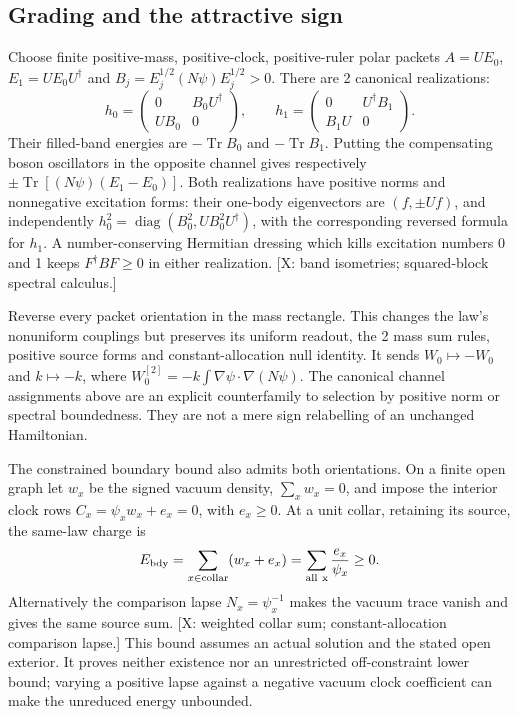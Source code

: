 \subsection*{Grading and the attractive sign}
Choose finite positive-mass, positive-clock, positive-ruler polar packets
$A=UE_0$, $E_1=UE_0U^\dagger$ and
$B_j=E_j^{1/2}(N\psi)E_j^{1/2}>0$.
There are 2 canonical realizations:
\[
 h_0=\begin{pmatrix}0&B_0U^\dagger\\UB_0&0\end{pmatrix},
 \qquad
 h_1=\begin{pmatrix}0&U^\dagger B_1\\B_1U&0\end{pmatrix}.
\]
Their filled-band energies are $-\operatorname{Tr}B_0$ and
$-\operatorname{Tr}B_1$.
Putting the compensating boson oscillators in the opposite channel
gives respectively
$\pm\operatorname{Tr}[(N\psi)(E_1-E_0)]$.
Both realizations have positive norms and nonnegative excitation
forms: their one-body eigenvectors are $(f,\pm Uf)$, and independently
$h_0^2=\operatorname{diag}(B_0^2,UB_0^2U^\dagger)$, with the
corresponding reversed formula for $h_1$.
A number-conserving Hermitian dressing which kills excitation
numbers 0 and 1 keeps $F^\dagger BF\ge0$ in either realization.
[X: band isometries; squared-block spectral calculus.]

Reverse every packet orientation in the mass rectangle.
This changes the law's nonuniform couplings but preserves its
uniform readout, the 2 mass sum rules, positive source forms and
constant-allocation null identity.
It sends $W_0\mapsto-W_0$ and $k\mapsto-k$, where
$W_0^{[2]}=-k\int\nabla\psi\cdot\nabla(N\psi)$.
The canonical channel assignments above are an explicit
counterfamily to selection by positive norm or spectral boundedness.
They are not a mere sign relabelling of an unchanged Hamiltonian.

The constrained boundary bound also admits both orientations.
On a finite open graph let $w_x$ be the signed vacuum density,
$\sum_xw_x=0$, and impose the interior clock rows
$C_x=\psi_xw_x+e_x=0$, with $e_x\ge0$.
At a unit collar, retaining its source, the same-law charge is
\[
 E_{\rm bdy}=\sum_{x\in{\rm collar}}(w_x+e_x)
            =\sum_{\rm all\ x}\frac{e_x}{\psi_x}\ge0 .
\]
Alternatively the comparison lapse $N_x=\psi_x^{-1}$ makes the
vacuum trace vanish and gives the same source sum.
[X: weighted collar sum; constant-allocation comparison lapse.]
This bound assumes an actual solution and the stated open exterior.
It proves neither existence nor an unrestricted off-constraint
lower bound; varying a positive lapse against a negative vacuum
clock coefficient can make the unreduced energy unbounded.

